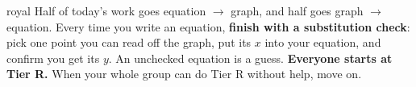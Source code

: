 \documentclass[10pt]{article}
\begin{document}

\vspace{0.15in}

\begin{scenariobox}{royal}
\small
Half of today's work goes equation $\to$ graph, and half goes graph $\to$ equation. Every time you
write an equation, \textbf{finish with a substitution check}: pick one point you can read off the
graph, put its $x$ into your equation, and confirm you get its $y$. An unchecked equation is a
guess. \textbf{Everyone starts at Tier R.} When your whole group can do Tier R without help, move on.
\end{scenariobox}

\vspace{0.10in}
\end{document}
